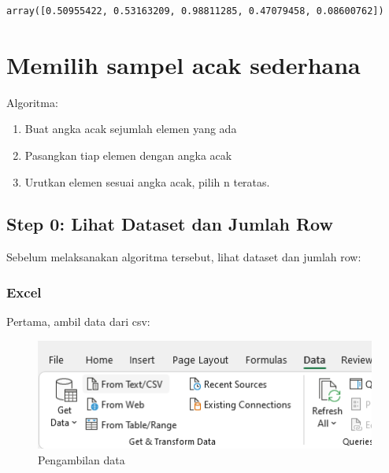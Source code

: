 \documentclass[
  letterpaper,
  DIV=11,
  numbers=noendperiod]{scrreprt}
\providecommand{\tightlist}{%
  \setlength{\itemsep}{0pt}\setlength{\parskip}{0pt}}\usepackage{longtable,booktabs,array}
\begin{document}
\begin{verbatim}
array([0.50955422, 0.53163209, 0.98811285, 0.47079458, 0.08600762])
\end{verbatim}

\hypertarget{memilih-sampel-acak-sederhana}{%
\section{Memilih sampel acak
sederhana}\label{memilih-sampel-acak-sederhana}}

Algoritma:

\begin{enumerate}
\def\labelenumi{\arabic{enumi}.}
\tightlist
\item
  Buat angka acak sejumlah elemen yang ada
\item
  Pasangkan tiap elemen dengan angka acak
\item
  Urutkan elemen sesuai angka acak, pilih n teratas.
\end{enumerate}

\hypertarget{step-0-lihat-dataset-dan-jumlah-row}{%
\subsection{Step 0: Lihat Dataset dan Jumlah
Row}\label{step-0-lihat-dataset-dan-jumlah-row}}

Sebelum melaksanakan algoritma tersebut, lihat dataset dan jumlah row:

\hypertarget{excel-1}{%
\subsubsection{Excel}\label{excel-1}}

Pertama, ambil data dari csv:

\begin{figure}

{\centering \includegraphics{./step0-getdata.png}

}

\caption{Pengambilan data}

\end{figure}
\end{document}
